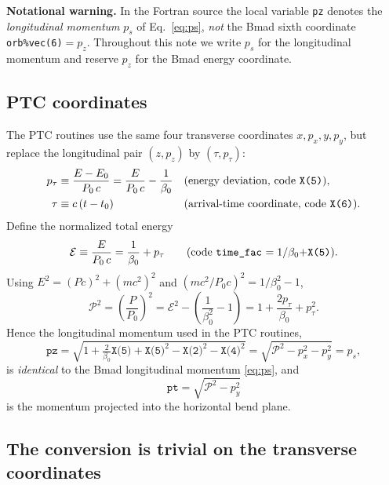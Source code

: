 \documentclass[11pt]{article}
\newcommand{\code}[1]{\texttt{#1}}
\newcommand{\ptcE}{\mathcal{E}}          %
\newcommand{\Pmag}{\mathcal{P}}          %
\begin{document}
\medskip
\noindent\textbf{Notational warning.} In the Fortran source the local variable
\code{pz} denotes the \emph{longitudinal momentum} $p_s$ of
Eq.~\eqref{eq:ps}, \emph{not} the Bmad sixth coordinate \code{orb\%vec(6)}$=p_z$.
Throughout this note we write $p_s$ for the longitudinal momentum and reserve
$p_z$ for the Bmad energy coordinate.

\subsection{PTC coordinates}

The PTC routines use the same four transverse coordinates $x, p_x, y, p_y$, but
replace the longitudinal pair $(z, p_z)$ by $(\tau, p_\tau)$:
\begin{align}
  p_\tau &\equiv \frac{E - E_0}{P_0\, c} = \frac{E}{P_0\, c} - \frac{1}{\beta_0}
     & &\text{(energy deviation, code \code{X(5)})}, \\
  \tau   &\equiv c\,(t - t_0)
     & &\text{(arrival-time coordinate, code \code{X(6)})}.
\end{align}
Define the normalized total energy
\begin{equation}
  \ptcE \equiv \frac{E}{P_0\,c} = \frac{1}{\beta_0} + p_\tau
  \qquad\text{(code \code{time\_fac} $= 1/\beta_0 + $\code{X(5)}).}
\end{equation}
Using $E^2 = (Pc)^2 + (mc^2)^2$ and $(mc^2/P_0c)^2 = 1/\beta_0^2 - 1$,
\begin{equation}
  \Pmag^2 = \left(\frac{P}{P_0}\right)^2
          = \ptcE^2 - \left(\frac{1}{\beta_0^2}-1\right)
          = 1 + \frac{2 p_\tau}{\beta_0} + p_\tau^2 .
  \label{eq:Pptc}
\end{equation}
Hence the longitudinal momentum used in the PTC routines,
\begin{equation}
  \code{pz} = \sqrt{1 + \tfrac{2}{\beta_0}\code{X(5)} + \code{X(5)}^2
                     - \code{X(2)}^2 - \code{X(4)}^2}
  = \sqrt{\Pmag^2 - p_x^2 - p_y^2} = p_s ,
\end{equation}
is \emph{identical} to the Bmad longitudinal momentum \eqref{eq:ps}, and
\begin{equation}
  \code{pt} = \sqrt{\Pmag^2 - p_y^2}
\end{equation}
is the momentum projected into the horizontal bend plane.

\subsection{The conversion is trivial on the transverse coordinates}
\end{document}
